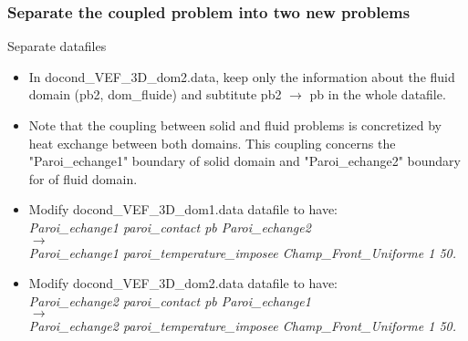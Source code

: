 \documentclass[10pt, hyperref={unicode=true,pdfusetitle, bookmarks=true,bookmarksnumbered=false,bookmarksopen=false, breaklinks=false,pdfborder={0 0 1},backref=true,colorlinks=true,linkcolor=darkblue,pageanchor, urlcolor=darkblue}]{beamer}
\begin{document}
\begin{frame}
\frametitle{Separate the coupled problem into two new problems}
\begin{block}{Separate datafiles}

\begin{itemize}
\item In docond\_VEF\_3D\_dom2.data, keep only the information about the fluid domain (pb2, dom\_fluide) and subtitute pb2 $\rightarrow$ pb in the whole datafile.
\item Note that the coupling between solid and fluid problems is concretized by heat exchange between both domains. This coupling concerns the "Paroi\_echange1" boundary of solid domain and "Paroi\_echange2" boundary for of fluid domain.
\item Modify docond\_VEF\_3D\_dom1.data datafile to have:\\
\textit{Paroi\_echange1 paroi\_contact pb Paroi\_echange2} \\
$\rightarrow$ \\
\textit{Paroi\_echange1 paroi\_temperature\_imposee Champ\_Front\_Uniforme 1 50.}
\item Modify docond\_VEF\_3D\_dom2.data datafile to have:\\
\textit{Paroi\_echange2 paroi\_contact pb Paroi\_echange1} \\
$\rightarrow$ \\
\textit{Paroi\_echange2 paroi\_temperature\_imposee Champ\_Front\_Uniforme 1 50.}
\end{itemize}

\end{block}
\end{frame}
\end{document}

